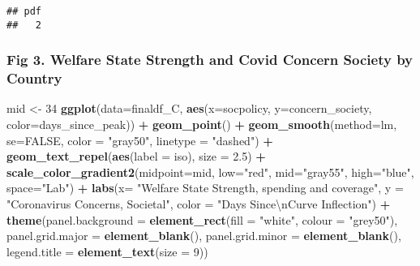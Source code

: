 \documentclass[
]{article}
\newenvironment{Shaded}{\begin{snugshade}}{\end{snugshade}}
\newcommand{\CharTok}[1]{\textcolor[rgb]{0.31,0.60,0.02}{#1}}
\newcommand{\DataTypeTok}[1]{\textcolor[rgb]{0.13,0.29,0.53}{#1}}
\newcommand{\DecValTok}[1]{\textcolor[rgb]{0.00,0.00,0.81}{#1}}
\newcommand{\FloatTok}[1]{\textcolor[rgb]{0.00,0.00,0.81}{#1}}
\newcommand{\KeywordTok}[1]{\textcolor[rgb]{0.13,0.29,0.53}{\textbf{#1}}}
\newcommand{\NormalTok}[1]{#1}
\newcommand{\OperatorTok}[1]{\textcolor[rgb]{0.81,0.36,0.00}{\textbf{#1}}}
\newcommand{\OtherTok}[1]{\textcolor[rgb]{0.56,0.35,0.01}{#1}}
\newcommand{\StringTok}[1]{\textcolor[rgb]{0.31,0.60,0.02}{#1}}
\begin{document}
\begin{verbatim}
## pdf 
##   2
\end{verbatim}

\hypertarget{fig-3.-welfare-state-strength-and-covid-concern-society-by-country}{%
\subsubsection{Fig 3. Welfare State Strength and Covid Concern Society
by
Country}\label{fig-3.-welfare-state-strength-and-covid-concern-society-by-country}}

\begin{Shaded}
\begin{Highlighting}[]
\NormalTok{mid <-}\StringTok{ }\DecValTok{34}
\KeywordTok{ggplot}\NormalTok{(}\DataTypeTok{data=}\NormalTok{finaldf_C, }\KeywordTok{aes}\NormalTok{(}\DataTypeTok{x=}\NormalTok{socpolicy, }\DataTypeTok{y=}\NormalTok{concern_society, }\DataTypeTok{color=}\NormalTok{days_since_peak)) }\OperatorTok{+}
\StringTok{  }\KeywordTok{geom_point}\NormalTok{() }\OperatorTok{+}
\StringTok{  }\KeywordTok{geom_smooth}\NormalTok{(}\DataTypeTok{method=}\NormalTok{lm, }\DataTypeTok{se=}\OtherTok{FALSE}\NormalTok{, }\DataTypeTok{color =} \StringTok{"gray50"}\NormalTok{, }\DataTypeTok{linetype =} \StringTok{"dashed"}\NormalTok{) }\OperatorTok{+}
\StringTok{  }\KeywordTok{geom_text_repel}\NormalTok{(}\KeywordTok{aes}\NormalTok{(}\DataTypeTok{label =}\NormalTok{ iso), }\DataTypeTok{size =} \FloatTok{2.5}\NormalTok{) }\OperatorTok{+}
\StringTok{  }\KeywordTok{scale_color_gradient2}\NormalTok{(}\DataTypeTok{midpoint=}\NormalTok{mid, }\DataTypeTok{low=}\StringTok{"red"}\NormalTok{, }\DataTypeTok{mid=}\StringTok{"gray55"}\NormalTok{, }\DataTypeTok{high=}\StringTok{"blue"}\NormalTok{, }\DataTypeTok{space=}\StringTok{"Lab"}\NormalTok{) }\OperatorTok{+}
\StringTok{  }\KeywordTok{labs}\NormalTok{(}\DataTypeTok{x=} \StringTok{"Welfare State Strength, spending and coverage"}\NormalTok{, }\DataTypeTok{y =} \StringTok{"Coronavirus Concerns, Societal"}\NormalTok{, }\DataTypeTok{color =} \StringTok{"Days Since}\CharTok{\textbackslash{}n}\StringTok{Curve Inflection"}\NormalTok{) }\OperatorTok{+}
\StringTok{      }\KeywordTok{theme}\NormalTok{(}\DataTypeTok{panel.background =} \KeywordTok{element_rect}\NormalTok{(}\DataTypeTok{fill =} \StringTok{"white"}\NormalTok{, }\DataTypeTok{colour =} \StringTok{"grey50"}\NormalTok{),}
        \DataTypeTok{panel.grid.major =} \KeywordTok{element_blank}\NormalTok{(),}
        \DataTypeTok{panel.grid.minor =} \KeywordTok{element_blank}\NormalTok{(),}
        \DataTypeTok{legend.title =} \KeywordTok{element_text}\NormalTok{(}\DataTypeTok{size =} \DecValTok{9}\NormalTok{))}
\end{Highlighting}
\end{Shaded}
\end{document}
